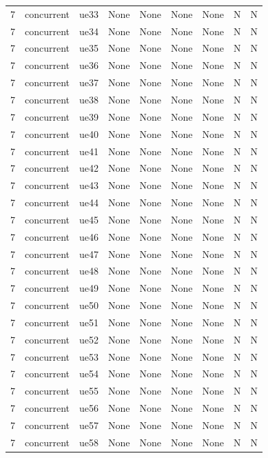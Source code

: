 \begin{table}[ht]
\begin{tabular}{|c|c|c|c|c|c|c|c|c|}
7 & concurrent & ue33 & None & None & None & None & N & N \\
7 & concurrent & ue34 & None & None & None & None & N & N \\
7 & concurrent & ue35 & None & None & None & None & N & N \\
7 & concurrent & ue36 & None & None & None & None & N & N \\
7 & concurrent & ue37 & None & None & None & None & N & N \\
7 & concurrent & ue38 & None & None & None & None & N & N \\
7 & concurrent & ue39 & None & None & None & None & N & N \\
7 & concurrent & ue40 & None & None & None & None & N & N \\
7 & concurrent & ue41 & None & None & None & None & N & N \\
7 & concurrent & ue42 & None & None & None & None & N & N \\
7 & concurrent & ue43 & None & None & None & None & N & N \\
7 & concurrent & ue44 & None & None & None & None & N & N \\
7 & concurrent & ue45 & None & None & None & None & N & N \\
7 & concurrent & ue46 & None & None & None & None & N & N \\
7 & concurrent & ue47 & None & None & None & None & N & N \\
7 & concurrent & ue48 & None & None & None & None & N & N \\
7 & concurrent & ue49 & None & None & None & None & N & N \\
7 & concurrent & ue50 & None & None & None & None & N & N \\
7 & concurrent & ue51 & None & None & None & None & N & N \\
7 & concurrent & ue52 & None & None & None & None & N & N \\
7 & concurrent & ue53 & None & None & None & None & N & N \\
7 & concurrent & ue54 & None & None & None & None & N & N \\
7 & concurrent & ue55 & None & None & None & None & N & N \\
7 & concurrent & ue56 & None & None & None & None & N & N \\
7 & concurrent & ue57 & None & None & None & None & N & N \\
7 & concurrent & ue58 & None & None & None & None & N & N \\

\end{tabular}
\end{table}
